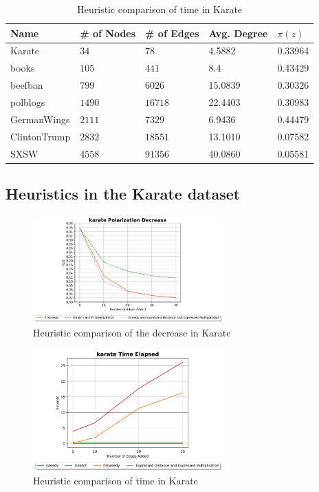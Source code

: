\begin{table}[H]
 \centering
 \caption{Stats}
 \label{tab:statistics}
 \begin{tabular}{| l || l | l | l | l |}
 \hline
  Name & # of Nodes & # of Edges & Avg. Degree & $\pi(z)$\\
  \hline
  \hline
  Karate & $34$ & $78$ & 4.5882 &  0.33964\\
  \hline
    books & $105$ & $441$ & 8.4 &  0.43429\\
  \hline
    beefban & $799$ & $6026$ & 15.0839 &  0.30326\\
  \hline
  polblogs & $1490$ & $16718$ & 22.4403 &  0.30983\\
  \hline
  GermanWings & $2111$ & $7329$ & 6.9436 &  0.44479\\
  \hline
  ClintonTrump & $2832$ & $18551$ & 13.1010 &  0.07582\\
  \hline
  SXSW & $4558$ & $91356$ & 40.0860 &  0.05581\\
  \hline
 \end{tabular}

 \clearpage

\subsection{Heuristics in the Karate dataset}


\begin{figure}[!htbp]
	\centering
	\includegraphics[width=0.65\textwidth]{Figures/Karate Polarization Decrease}
	\caption{Heuristic comparison of the decrease in Karate}
	\label{fig:karate_pol}
\end{figure}

\clearpage


\begin{figure}[!htbp]
	\centering
	\includegraphics[width=0.65\textwidth]{Figures/Karate Time Elapsed}
	\caption{Heuristic comparison of time in Karate}
	\label{fig:karate_time}
\end{figure}



\end{table}
